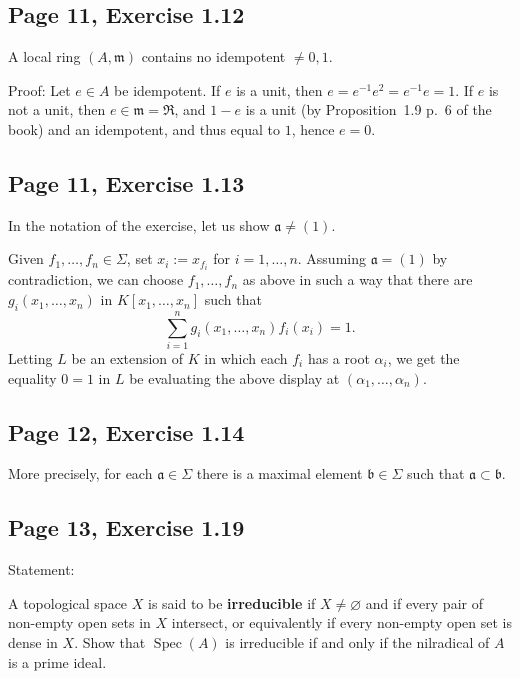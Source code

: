 \documentclass[parskip=half,fontsize=12pt]{scrartcl}%
\newcommand{\mf}{\mathfrak}
\newcommand{\aaa}{\mf a}
\newcommand{\bbb}{\mf b}
\newcommand{\mmm}{\mf m}
\newcommand{\Spec}{\operatorname{Spec}}\newcommand{\Sp}{\operatorname{Spec}}
\begin{document}
\subsection{Page 11, Exercise 1.12}\label{112}%

A local ring $(A,\mmm)$ contains no idempotent $\neq0,1$. %

Proof: Let $e\in A$ be idempotent. If $e$ is a unit, then $e=e^{-1}e^2=e^{-1}e=1$. If $e$ is not a unit, then $e\in\mmm=\mf R$, and $1-e$ is a unit (by Proposition~1.9 p.~6 of the book) and an idempotent, and thus equal to $1$, hence $e=0$.

\subsection{Page 11, Exercise 1.13}%

In the notation of the exercise, let us show $\aaa\neq(1)$. 

Given $f_1,\dots,f_n\in\Sigma$, set $x_i:=x_{f_i}$ for $i=1,\dots,n$. Assuming $\aaa=(1)$ by contradiction, we can choose $f_1,\dots,f_n$ as above in such a way that there are $g_i(x_1,\dots,x_n)$ in $K[x_1,\dots,x_n]$ such that 
$$
\sum_{i=1}^n g_i(x_1,\dots,x_n)f_i(x_i)=1.
$$ 
Letting $L$ be an extension of $K$ in which each $f_i$ has a root $\alpha_i$, we get the equality $0=1$ in $L$ be evaluating the above display at $(\alpha_1,\dots,\alpha_n)$.

\subsection{Page 12, Exercise 1.14}\label{114}%

More precisely, for each $\mf a\in\Sigma$ there is a maximal element $\bbb\in\Sigma$ such that $\mf a\subset\bbb$.

\subsection{Page 13, Exercise 1.19}\label{irr}%

Statement:

A topological space $X$ is said to be \textbf{irreducible} if $X\ne\varnothing$ and if every pair of non-empty open sets in $X$ intersect, or equivalently if every non-empty open set is dense in $X$. Show that $\Spec(A)$ is irreducible if and only if the nilradical of $A$ is a prime ideal.
\end{document}
